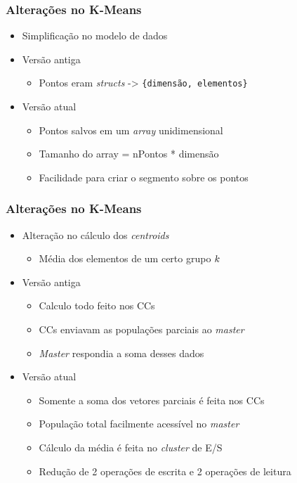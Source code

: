 \documentclass[xcolor={table}]{beamer}
\begin{document}
\begin{frame}\frametitle{Alterações no K-Means}
    \begin{itemize}
        \item {Simplificação no modelo de dados}
        \item {Versão antiga}
        \begin{itemize}
            \item {Pontos eram \textit{structs} -> \texttt{\{dimensão, elementos\}}}
        \end{itemize}
        \item {Versão atual}
        \begin{itemize}
            \item {Pontos salvos em um \textit{array} unidimensional}
            \item {Tamanho do array = nPontos * dimensão}
            \item {Facilidade para criar o segmento sobre os pontos}
        \end{itemize}
    \end{itemize}
\end{frame}

\begin{frame}\frametitle{Alterações no K-Means}
    \begin{itemize}
        \item {Alteração no cálculo dos \textit{centroids}}
        \begin{itemize}
            \item {Média dos elementos de um certo grupo $\mathnormal{k}$}
        \end{itemize}
        \item {Versão antiga}
        \begin{itemize}
            \item {Calculo todo feito nos CCs}
            \item {CCs enviavam as populações parciais ao \textit{master}}
            \item {\textit{Master} respondia a soma desses dados}
        \end{itemize}
        \item {Versão atual}
        \begin{itemize}
            \item {Somente a soma dos vetores parciais é feita nos CCs}
            \item {População total facilmente acessível no \textit{master}}
            \item {Cálculo da média é feita no \textit{cluster} de E/S}
            \item {Redução de 2 operações de escrita e 2 operações de leitura}
        \end{itemize}
    \end{itemize}
\end{frame}
\end{document}
